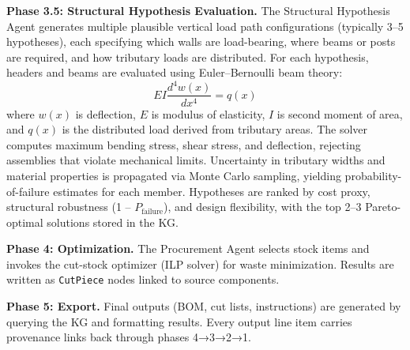 \textbf{Phase 3.5: Structural Hypothesis Evaluation.}
The Structural Hypothesis Agent generates multiple plausible vertical load path configurations (typically 3--5 hypotheses), each specifying which walls are load-bearing, where beams or posts are required, and how tributary loads are distributed.
For each hypothesis, headers and beams are evaluated using Euler--Bernoulli beam theory:
\[
EI \frac{d^4 w(x)}{dx^4} = q(x)
\]
where $w(x)$ is deflection, $E$ is modulus of elasticity, $I$ is second moment of area, and $q(x)$ is the distributed load derived from tributary areas.
The solver computes maximum bending stress, shear stress, and deflection, rejecting assemblies that violate mechanical limits.
Uncertainty in tributary widths and material properties is propagated via Monte Carlo sampling, yielding probability-of-failure estimates for each member.
Hypotheses are ranked by cost proxy, structural robustness (1 -- $P_{\text{failure}}$), and design flexibility, with the top 2--3 Pareto-optimal solutions stored in the KG.

\textbf{Phase 4: Optimization.}
The Procurement Agent selects stock items and invokes the cut-stock optimizer (ILP solver) for waste minimization.
Results are written as \texttt{CutPiece} nodes linked to source components.

\textbf{Phase 5: Export.}
Final outputs (BOM, cut lists, instructions) are generated by querying the KG and formatting results.
Every output line item carries provenance links back through phases 4→3→2→1.
